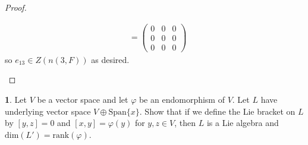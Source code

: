 \documentclass[12pt]{article}
\theoremstyle{definition}
\newtheorem{ex}{}
\begin{document}
\begin{proof}
\begin{enumerate}[label=(\alph*)]
\begin{align*}
			                                                                                                                                                      & = \begin{pmatrix}0 & 0 & 0 \\ 0 & 0 & 0 \\ 0 & 0 & 0\end{pmatrix}
		      \end{align*}
		      so $e_{13} \in Z(n(3, F))$ as desired.
	\end{enumerate}
\end{proof}

\begin{ex}
	Let $V$ be a vector space and let $\varphi$ be an endomorphism of $V$.
	Let $L$ have underlying vector space $V \oplus \mathrm{Span}\lbrace x \rbrace$.
	Show that if we define the Lie bracket on $L$ by $[y, z] = 0$ and $[x, y] = \varphi(y)$ for $y, z \in V$, then $L$ is a Lie algebra and $\mathrm{dim}(L') = \mathrm{rank}(\varphi)$.
\end{ex}
\end{document}
